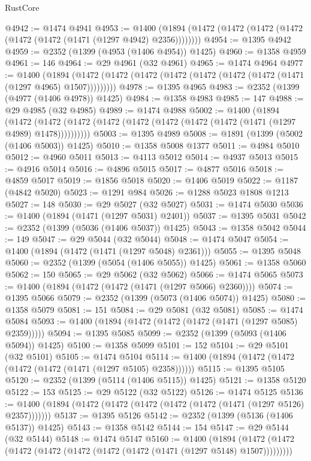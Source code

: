 \begin{lexlean}{RustCore}
\begin{coremodule}
@4942 := @1474 @4941
@4953 := @1400 (@1894 (@1472 (@1472 (@1472 (@1472 (@1472 (@1472 (@1471 (@1297 @4942) @2356))))))))
@4954 := @1395 @4942
@4959 := @2352 (@1399 (@4953 (@1406 @4954)) @1425)
@4960 := @1358 @4959
@4961 := 146
@4964 := @29 @4961 (@32 @4961)
@4965 := @1474 @4964
@4977 := @1400
    (@1894 (@1472 (@1472 (@1472 (@1472 (@1472 (@1472 (@1472 (@1471 (@1297 @4965) @1507)))))))))
@4978 := @1395 @4965
@4983 := @2352 (@1399 (@4977 (@1406 @4978)) @1425)
@4984 := @1358 @4983
@4985 := 147
@4988 := @29 @4985 (@32 @4985)
@4989 := @1474 @4988
@5002 := @1400
    (@1894
      (@1472 (@1472 (@1472 (@1472 (@1472 (@1472 (@1472 (@1472 (@1471 (@1297 @4989) @1478))))))))))
@5003 := @1395 @4989
@5008 := @1891 (@1399 (@5002 (@1406 @5003)) @1425)
@5010 := @1358 @5008 @1377
@5011 := @4984 @5010
@5012 := @4960 @5011
@5013 := @4113 @5012
@5014 := @4937 @5013
@5015 := @4916 @5014
@5016 := @4896 @5015
@5017 := @4877 @5016
@5018 := @4859 @5017
@5019 := @1856 @5018
@5020 := @1406 @5019
@5022 := @1187 (@4842 @5020)
@5023 := @1291 @984
@5026 := @1288 @5023 @1808 @1213
@5027 := 148
@5030 := @29 @5027 (@32 @5027)
@5031 := @1474 @5030
@5036 := @1400 (@1894 (@1471 (@1297 @5031) @2401))
@5037 := @1395 @5031
@5042 := @2352 (@1399 (@5036 (@1406 @5037)) @1425)
@5043 := @1358 @5042
@5044 := 149
@5047 := @29 @5044 (@32 @5044)
@5048 := @1474 @5047
@5054 := @1400 (@1894 (@1472 (@1471 (@1297 @5048) @2361)))
@5055 := @1395 @5048
@5060 := @2352 (@1399 (@5054 (@1406 @5055)) @1425)
@5061 := @1358 @5060
@5062 := 150
@5065 := @29 @5062 (@32 @5062)
@5066 := @1474 @5065
@5073 := @1400 (@1894 (@1472 (@1472 (@1471 (@1297 @5066) @2360))))
@5074 := @1395 @5066
@5079 := @2352 (@1399 (@5073 (@1406 @5074)) @1425)
@5080 := @1358 @5079
@5081 := 151
@5084 := @29 @5081 (@32 @5081)
@5085 := @1474 @5084
@5093 := @1400 (@1894 (@1472 (@1472 (@1472 (@1471 (@1297 @5085) @2359)))))
@5094 := @1395 @5085
@5099 := @2352 (@1399 (@5093 (@1406 @5094)) @1425)
@5100 := @1358 @5099
@5101 := 152
@5104 := @29 @5101 (@32 @5101)
@5105 := @1474 @5104
@5114 := @1400 (@1894 (@1472 (@1472 (@1472 (@1472 (@1471 (@1297 @5105) @2358))))))
@5115 := @1395 @5105
@5120 := @2352 (@1399 (@5114 (@1406 @5115)) @1425)
@5121 := @1358 @5120
@5122 := 153
@5125 := @29 @5122 (@32 @5122)
@5126 := @1474 @5125
@5136 := @1400 (@1894 (@1472 (@1472 (@1472 (@1472 (@1472 (@1471 (@1297 @5126) @2357)))))))
@5137 := @1395 @5126
@5142 := @2352 (@1399 (@5136 (@1406 @5137)) @1425)
@5143 := @1358 @5142
@5144 := 154
@5147 := @29 @5144 (@32 @5144)
@5148 := @1474 @5147
@5160 := @1400
    (@1894 (@1472 (@1472 (@1472 (@1472 (@1472 (@1472 (@1472 (@1471 (@1297 @5148) @1507)))))))))

\end{coremodule}
\end{lexlean}
